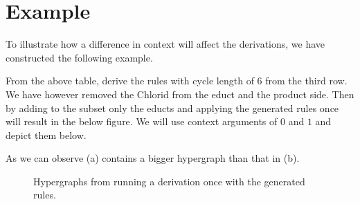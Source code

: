 \documentclass{article}
\begin{document}
\section{Example}

To illustrate how a difference in context will affect the derivations, we have constructed the following example.

From the above table, derive the rules with cycle length of 6 from the third row. We have however removed the Chlorid from the educt and the product side. Then by adding to the subset only the educts and applying the generated rules once will result in the below figure. We will use context arguments of $0$ and $1$ and depict them below.

As we can observe (a) contains a bigger hypergraph than that in (b).

\begin{figure}[h!]
    \centering
    \caption{Hypergraphs from running a derivation once with the generated rules.}
    \newline

\end{figure}
\end{document}
